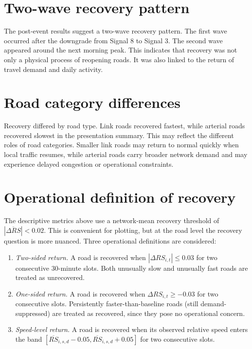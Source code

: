 \documentclass[12pt,a4paper]{report}
\begin{document}
\section{Two-wave recovery pattern}
The post-event results suggest a two-wave recovery pattern. The first wave occurred after the downgrade from Signal 8 to Signal 3. The second wave appeared around the next morning peak. This indicates that recovery was not only a physical process of reopening roads. It was also linked to the return of travel demand and daily activity.

\section{Road category differences}
Recovery differed by road type. Link roads recovered fastest, while arterial roads recovered slowest in the presentation summary. This may reflect the different roles of road categories. Smaller link roads may return to normal quickly when local traffic resumes, while arterial roads carry broader network demand and may experience delayed congestion or operational constraints.

\section{Operational definition of recovery}
The descriptive metrics above use a network-mean recovery threshold of $|\overline{\Delta RS}| < 0.02$. This is convenient for plotting, but at the road level the recovery question is more nuanced. Three operational definitions are considered:

\begin{enumerate}[label=(\alph*)]
  \item \textit{Two-sided return.} A road is recovered when $|\Delta RS_{i,t}| \le 0.03$ for two consecutive 30-minute slots. Both unusually slow and unusually fast roads are treated as unrecovered.
  \item \textit{One-sided return.} A road is recovered when $\Delta RS_{i,t} \ge -0.03$ for two consecutive slots. Persistently faster-than-baseline roads (still demand-suppressed) are treated as recovered, since they pose no operational concern.
  \item \textit{Speed-level return.} A road is recovered when its observed relative speed enters the band $[\overline{RS}_{i,s,d} - 0.05, \overline{RS}_{i,s,d} + 0.05]$ for two consecutive slots.
\end{enumerate}
\end{document}
